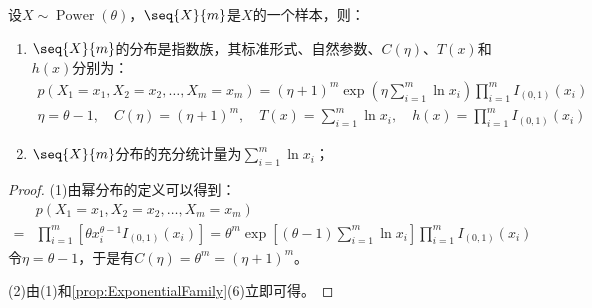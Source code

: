 \begin{theorem}
	设$X\sim\operatorname{Power}(\theta)$，$\seq{X}{m}$是$X$的一个样本，则：
	\begin{enumerate}
		\item $\seq{X}{m}$的分布是指数族，其标准形式、自然参数、$C(\eta)$、$T(x)$和$h(x)$分别为：
		\begin{gather*}
			p(X_1=x_1,X_2=x_2,\dots,X_m=x_m)=(\eta+1)^m\exp\left(\eta\sum_{i=1}^{m}\ln x_i\right)\prod_{i=1}^{m}I_{(0,1)}(x_i) \\
			\eta=\theta-1,\quad C(\eta)=(\eta+1)^m,\quad
			T(x)=\sum_{i=1}^{m}\ln x_i,\quad h(x)=\prod_{i=1}^{m}I_{(0,1)}(x_i)
		\end{gather*}
		\item $\seq{X}{m}$分布的充分统计量为$\sum\limits_{i=1}^{m}\ln x_i$；
	\end{enumerate}
\end{theorem}
\begin{proof}
	(1)由幂分布的定义可以得到：
	\begin{align*}
		&p(X_1=x_1,X_2=x_2,\dots,X_m=x_m) \\
		=&\prod_{i=1}^{m}\left[\theta x_i^{\theta-1}I_{(0,1)}(x_i)\right]=\theta^m\exp\left[(\theta-1)\sum_{i=1}^{m}\ln x_i\right]\prod_{i=1}^{m}I_{(0,1)}(x_i)
	\end{align*}
	令$\eta=\theta-1$，于是有$C(\eta)=\theta^{m}=(\eta+1)^m$。\par
	(2)由(1)和\cref{prop:ExponentialFamily}(6)立即可得。
\end{proof}

